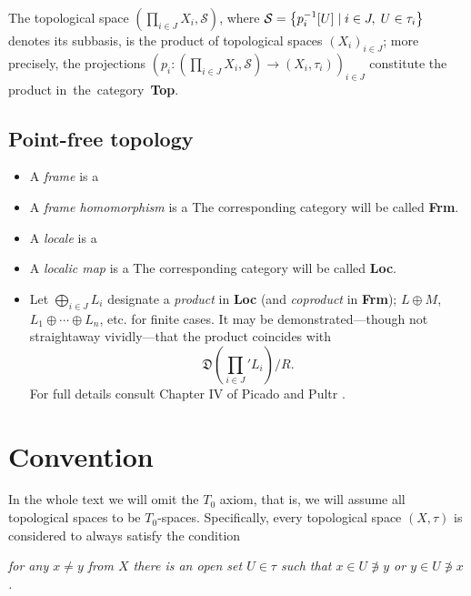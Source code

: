 \begin{fact}
  The topological space $\left( \prod_{i\in J} X_i, \mathcal{S} \right)$, where
  $\mathcal{S} = \left\{ p_{i}^{-1}[U] \mid i\in J, \; U\in \tau_i \right\}$
  denotes its subbasis, is the product of topological spaces $\left( X_i
  \right)_{i\in J}$;
  more precisely, the projections $\left( p_i: \left(\prod_{i\in J} X_i,
  \mathcal{S}\right) \to \left(X_i, \tau_i\right) \right)_{i\in J}$
  constitute the product in~the~category~{\bf Top}.
\end{fact}

\subsection*{Point-free topology}

\begin{itemize}
\item A \emph{frame} is a
\item A \emph{frame homomorphism} is a
The corresponding category will be called {\bf Frm}.
\item A \emph{locale} is a
\item A \emph{localic map} is a 
The corresponding category will be called {\bf Loc}.
\item Let $\bigoplus_{i\in J} L_i$ designate a \emph{product} in {\bf Loc} (and
\emph{coproduct} in {\bf Frm}); $L \oplus M$, $L_1 \oplus\cdots\oplus L_n$, etc.
for finite cases.
It may be demonstrated---though not straightaway vividly---that the product
coincides with
\[
  \textstyle\mathfrak{D}\left(\prod_{i\in J}' L_{i}\right)/R.
\]
For full details consult Chapter IV of Picado and Pultr \cite{picado-pultr12}.
\end{itemize}

\section*{Convention}

In the whole text we will omit the $T_0$ axiom, that is, we will assume all
topological spaces to be $T_0$-spaces.
Specifically, every topological space $(X, \tau)$ is considered to always
satisfy the condition
\begin{center} \it
  for any $x \ne y$ from $X$ there is an open set $U \in \tau$ such that $x \in U
  \not\owns y$ or $y \in U \not\owns x$.
\end{center}
